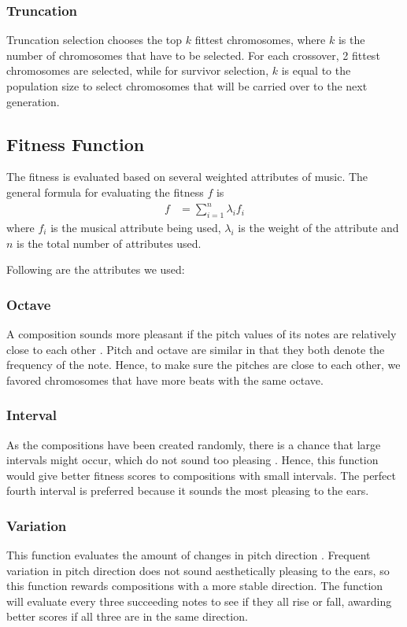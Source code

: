 \documentclass[conference]{IEEEtran}
\begin{document}
\subsubsection{Truncation}
Truncation selection chooses the top $k$ fittest chromosomes, where $k$ is the number of chromosomes that have to be selected. For each crossover, 2 fittest chromosomes are selected, while for survivor selection, $k$ is equal to the population size to select chromosomes that will be carried over to the next generation.

\subsection{Fitness Function}
The fitness is evaluated based on several weighted attributes of music. The general formula for evaluating the fitness $f$ is
\begin{align*}
f &= \sum_{i=1}^{n} \lambda_{i}f_{i}
\end{align*}
where $f_{i}$ is the musical attribute being used, $\lambda_{i}$ is the weight of the attribute and $n$ is the total number of attributes used.

Following are the attributes we used:

\subsubsection{Octave}
A composition sounds more pleasant if the pitch values of its notes are relatively close to each other \cite{b2}. Pitch and octave are similar in that they both denote the frequency of the note. Hence, to make sure the pitches are close to each other, we favored chromosomes that have more beats with the same octave.

\subsubsection{Interval}
As the compositions have been created randomly, there is a chance that large intervals might occur, which do not sound too pleasing \cite{b3}. Hence, this function would give better fitness scores to compositions with small intervals. The perfect fourth interval is preferred \cite{b1} because it sounds the most pleasing to the ears.

\subsubsection{Variation}
This function evaluates the amount of changes in pitch direction \cite{b2}. Frequent variation in pitch direction does not sound aesthetically pleasing to the ears, so this function rewards compositions with a more stable direction. The function will evaluate every three succeeding notes to see if they all rise or fall, awarding better scores if all three are in the same direction.
\end{document}
